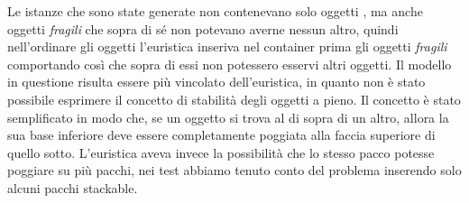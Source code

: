Le istanze che sono state generate non contenevano solo oggetti , ma anche oggetti \textit{fragili} che sopra di sé non potevano averne nessun altro, quindi nell'ordinare gli oggetti l'euristica inseriva nel container prima gli oggetti \textit{fragili} comportando così che sopra di essi non potessero esservi altri oggetti. Il modello in questione risulta essere più vincolato dell'euristica, in quanto non è stato possibile esprimere il concetto di stabilità degli oggetti a pieno. Il concetto è stato semplificato in modo che, se un oggetto si trova al di sopra di un altro, allora la sua base inferiore deve essere completamente poggiata alla faccia superiore di quello sotto. L'euristica aveva invece la possibilità che lo stesso pacco potesse poggiare su più pacchi, nei test abbiamo tenuto conto del problema inserendo solo alcuni pacchi stackable.